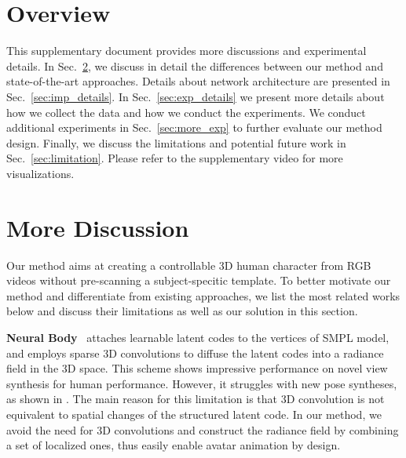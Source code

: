 

\section{Overview}
This supplementary document provides more discussions and experimental details. 
In Sec.~\ref{sec:more_discussion}, we discuss in detail the differences between our method and state-of-the-art approaches. 
Details about network architecture are presented in Sec.~\ref{sec:imp_details}. 
In Sec.~\ref{sec:exp_details} we present more details about how we collect the data and how we conduct the experiments. 
We conduct additional experiments in Sec.~\ref{sec:more_exp} to further evaluate our method design. 
Finally, we discuss the limitations and potential future work in Sec.~\ref{sec:limitation}. 
Please refer to the supplementary video for more visualizations. 

\section{More Discussion}
\label{sec:more_discussion}
Our method aims at creating a controllable 3D human character from RGB videos without pre-scanning a subject-specitic template. 
To better motivate our method and differentiate from existing approaches, we list the most related works below and discuss their limitations as well as our solution in this section. 

\textbf{Neural Body}~\cite{peng2021neuralbody} attaches learnable latent codes to the vertices of SMPL model, and employs sparse 3D convolutions to diffuse the latent codes into a radiance field in the 3D space. This scheme shows impressive performance on novel view synthesis for human performance. However, it struggles with new pose syntheses, as shown in \cite{peng2021animatable_nerf}. The main reason for this limitation is that 3D convolution is not equivalent to spatial changes of the structured latent code. In our method, we avoid the need for 3D convolutions and construct the radiance field by combining a set of localized ones, thus easily enable avatar animation by design.

